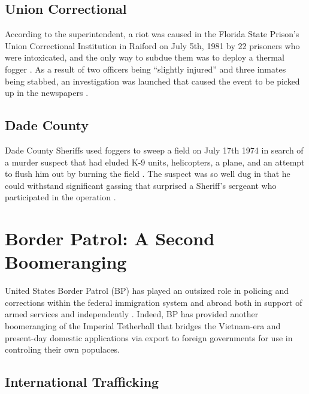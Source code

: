 \documentclass[
  11pt,
  titlepage]{krantz}
\begin{document}
\hypertarget{union-correctional}{%
\section*{Union Correctional}\label{union-correctional}}


According to the superintendent, a riot was caused in the Florida State Prison's Union Correctional Institution in Raiford on July 5th, 1981 by 22 prisoners who were intoxicated, and the only way to subdue them was to deploy a thermal fogger \citep{TallahasseeDemocrat1981_07_07}.
As a result of two officers being ``slightly injured'' and three inmates being stabbed, an investigation was launched that caused the event to be picked up in the newspapers \citep{TallahasseeDemocrat1981_07_07}.

\hypertarget{dade-county}{%
\section*{Dade County}\label{dade-county}}


Dade County Sheriffs used foggers to sweep a field on July 17th 1974 in search of a murder suspect that had eluded K-9 units, helicopters, a plane, and an attempt to flush him out by burning the field \citep{TampaBayTimes1974_07_18}.
The suspect was so well dug in that he could withstand significant gassing that surprised a Sheriff's sergeant who participated in the operation \citep{TampaBayTimes1974_07_18}.

\hypertarget{CBP}{%
\chapter*{Border Patrol: A Second Boomeranging}\label{CBP}}


United States Border Patrol (BP) has played an outsized role in policing and corrections within the federal immigration system and abroad both in support of armed services and independently \citep{Miller2019}.
Indeed, BP has provided another boomeranging of the Imperial Tetherball that bridges the Vietnam-era and present-day domestic applications via export to foreign governments for use in controling their own populaces.

\hypertarget{international-trafficking}{%
\section*{International Trafficking}\label{international-trafficking}}
\end{document}
